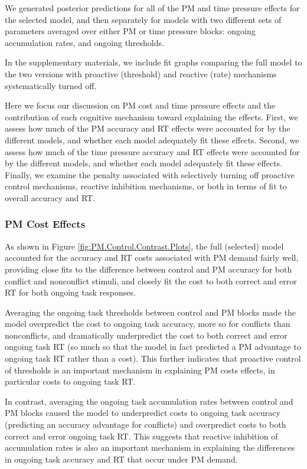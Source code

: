 \documentclass[11pt,]{article}
\begin{document}
We generated posterior predictions for all of the PM and time pressure
effects for the selected model, and then separately for models with two
different sets of parameters averaged over either PM or time pressure
blocks: ongoing accumulation rates, and ongoing thresholds.

In the supplementary materials, we include fit graphs comparing the full
model to the two versions with proactive (threshold) and reactive (rate)
mechanisms systematically turned off.

Here we focus our discussion on PM cost and time pressure effects and
the contribution of each cognitive mechanism toward explaining the
effects. First, we assess how much of the PM accuracy and RT effects
were accounted for by the different models, and whether each model
adequately fit these effects. Second, we assess how much of the time
pressure accuracy and RT effects were accounted for by the different
models, and whether each model adequately fit these effects. Finally, we
examine the penalty associated with selectively turning off proactive
control mechanisms, reactive inhibition mechanisms, or both in terms of
fit to overall accuracy and RT.

\subsubsection{PM Cost Effects}\label{pm-cost-effects}

As shown in Figure \ref{fig:PM.Control.Contrast.Plots}, the full
(selected) model accounted for the accuracy and RT costs associated with
PM demand fairly well, providing close fits to the difference between
control and PM accuracy for both conflict and nonconflict stimuli, and
closely fit the cost to both correct and error RT for both ongoing task
responses.

Averaging the ongoing task thresholds between control and PM blocks made
the model overpredict the cost to ongoing task accuracy, more so for
conflicts than nonconflicts, and dramatically underpredict the cost to
both correct and error ongoing task RT (so much so that the model in
fact predicted a PM advantage to ongoing task RT rather than a cost).
This further indicates that proactive control of thresholds is an
important mechanism in explaining PM costs effects, in particular costs
to ongoing task RT.

In contrast, averaging the ongoing task accumulation rates between
control and PM blocks caused the model to underpredict costs to ongoing
task accuracy (predicting an accuracy advantage for conflicts) and
overpredict costs to both correct and error ongoing task RT. This
suggests that reactive inhibition of accumulation rates is also an
important mechanism in explaining the differences in ongoing task
accuracy and RT that occur under PM demand.
\end{document}
